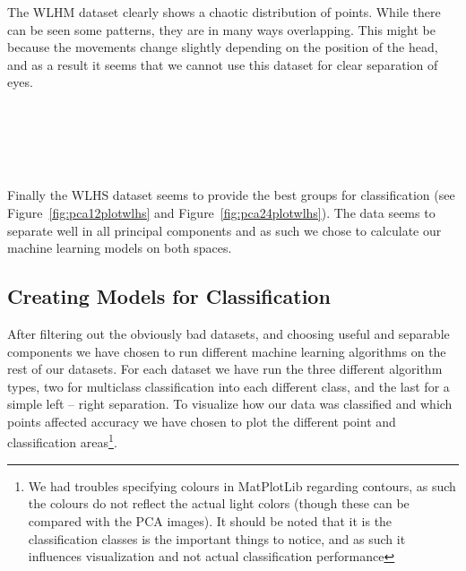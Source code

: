 The WLHM dataset clearly shows a chaotic distribution of points. While there can be seen some patterns, they are in many ways overlapping.
This might be because the movements change slightly depending on the position of the head, and as a result it seems that we cannot use this
dataset for clear separation of eyes.

\begin{minipage}{\linewidth}
  \centering
  \label{fig:pca12plotwlhs}
\end{minipage}\\\\

\begin{minipage}{\linewidth}
  \centering
  \label{fig:pca24plotwlhs}
\end{minipage}\\\\

Finally the WLHS dataset seems to provide the best groups for classification (see Figure~\ref{fig:pca12plotwlhs} and Figure~\ref{fig:pca24plotwlhs}). The data
seems to separate well in all principal components and as such we chose to calculate our machine learning models on both spaces.

\subsection{Creating Models for Classification}
\label{sub:CreatingModelsforClassification}

After filtering out the obviously bad datasets, and choosing useful and separable components we have chosen to run different machine learning algorithms 
on the rest of our datasets. For each dataset we have run the three different algorithm types, two for multiclass classification into each different class,
and the last for a simple left -- right separation. To visualize how our data was classified and which points affected accuracy we have chosen
to plot the different point and classification areas\footnote{We had troubles specifying colours in MatPlotLib regarding contours, as such the colours do not reflect the actual light colors (though these can be compared with the PCA images).
  It should be noted that it is the classification classes is the important things to notice, and as such it influences visualization and not actual classification performance}.\\

